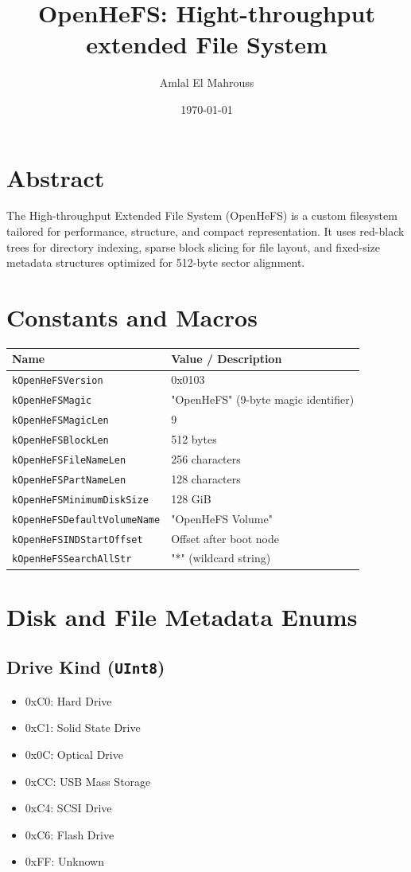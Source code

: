 \documentclass{article}
\title{OpenHeFS: Hight-throughput extended File System}
\author{Amlal El Mahrouss}
\date{\today}
\begin{document}
\maketitle

\section{Abstract}
The High-throughput Extended File System (OpenHeFS) is a custom filesystem tailored for performance, structure, and compact representation. It uses red-black trees for directory indexing, sparse block slicing for file layout, and fixed-size metadata structures optimized for 512-byte sector alignment.

\section{Constants and Macros}
\begin{longtable}{|l|l|}
\hline
\textbf{Name} & \textbf{Value / Description} \\
\hline
\texttt{kOpenHeFSVersion} & 0x0103 \\
\texttt{kOpenHeFSMagic} & "OpenHeFS" (9-byte magic identifier) \\
\texttt{kOpenHeFSMagicLen} & 9 \\
\texttt{kOpenHeFSBlockLen} & 512 bytes \\
\texttt{kOpenHeFSFileNameLen} & 256 characters \\
\texttt{kOpenHeFSPartNameLen} & 128 characters \\
\texttt{kOpenHeFSMinimumDiskSize} & 128 GiB \\
\texttt{kOpenHeFSDefaultVolumeName} & "OpenHeFS Volume" \\
\texttt{kOpenHeFSINDStartOffset} & Offset after boot node \\
\texttt{kOpenHeFSSearchAllStr} & "*" (wildcard string) \\
\hline
\end{longtable}

\section{Disk and File Metadata Enums}\label{sec:disk-and-file-metadata-enums}

\subsection{Drive Kind (\texttt{UInt8})}\label{subsec:drive-kind-(texttt{uint8})}
\begin{itemize}
\item 0xC0: Hard Drive
\item 0xC1: Solid State Drive
\item 0x0C: Optical Drive
\item 0xCC: USB Mass Storage
\item 0xC4: SCSI Drive
\item 0xC6: Flash Drive
\item 0xFF: Unknown
\end{itemize}
\end{document}

